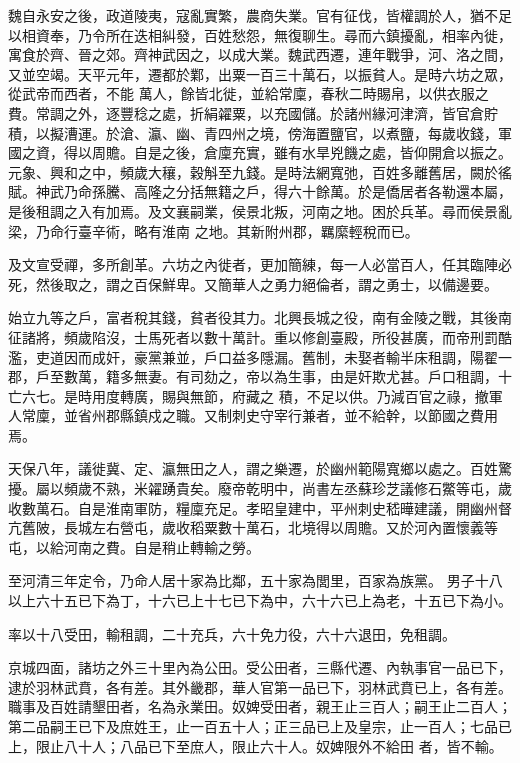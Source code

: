 \begin{pinyinscope}
 魏自永安之後，政道陵夷，寇亂實繁，農商失業。官有征伐，皆權調於人，猶不足以相資奉，乃令所在迭相糾發，百姓愁怨，無復聊生。尋而六鎮擾亂，相率內徙，寓食於齊、晉之郊。齊神武因之，以成大業。魏武西遷，連年戰爭，河、洛之間，又並空竭。天平元年，遷都於鄴，出粟一百三十萬石，以振貧人。是時六坊之眾，從武帝而西者，不能
 萬人，餘皆北徙，並給常廩，春秋二時賜帛，以供衣服之費。常調之外，逐豐稔之處，折絹糴粟，以充國儲。於諸州緣河津濟，皆官倉貯積，以擬漕運。於滄、瀛、幽、青四州之境，傍海置鹽官，以煮鹽，每歲收錢，軍國之資，得以周贍。自是之後，倉廩充實，雖有水旱兇饑之處，皆仰開倉以振之。元象、興和之中，頻歲大穰，穀斛至九錢。是時法網寬弛，百姓多離舊居，闕於徭賦。神武乃命孫騰、高隆之分括無籍之戶，得六十餘萬。於是僑居者各勒還本屬，是後租調之入有加焉。及文襄嗣業，侯景北叛，河南之地。困於兵革。尋而侯景亂梁，乃命行臺辛術，略有淮南
 之地。其新附州郡，羈縻輕稅而已。



 及文宣受禪，多所創革。六坊之內徙者，更加簡練，每一人必當百人，任其臨陣必死，然後取之，謂之百保鮮卑。又簡華人之勇力絕倫者，謂之勇士，以備邊要。



 始立九等之戶，富者稅其錢，貧者役其力。北興長城之役，南有金陵之戰，其後南征諸將，頻歲陷沒，士馬死者以數十萬計。重以修創臺殿，所役甚廣，而帝刑罰酷濫，吏道因而成奸，豪黨兼並，戶口益多隱漏。舊制，未娶者輸半床租調，陽翟一郡，戶至數萬，籍多無妻。有司劾之，帝以為生事，由是奸欺尤甚。戶口租調，十亡六七。是時用度轉廣，賜與無節，府藏之
 積，不足以供。乃減百官之祿，撤軍人常廩，並省州郡縣鎮戍之職。又制刺史守宰行兼者，並不給幹，以節國之費用焉。



 天保八年，議徙冀、定、瀛無田之人，謂之樂遷，於幽州範陽寬鄉以處之。百姓驚擾。屬以頻歲不熟，米糴踴貴矣。廢帝乾明中，尚書左丞蘇珍芝議修石鱉等屯，歲收數萬石。自是淮南軍防，糧廩充足。孝昭皇建中，平州刺史嵇曄建議，開幽州督亢舊陂，長城左右營屯，歲收稻粟數十萬石，北境得以周贍。又於河內置懷義等屯，以給河南之費。自是稍止轉輸之勞。



 至河清三年定令，乃命人居十家為比鄰，五十家為閭里，百家為族黨。
 男子十八以上六十五已下為丁，十六已上十七已下為中，六十六已上為老，十五已下為小。



 率以十八受田，輸租調，二十充兵，六十免力役，六十六退田，免租調。



 京城四面，諸坊之外三十里內為公田。受公田者，三縣代遷、內執事官一品已下，逮於羽林武賁，各有差。其外畿郡，華人官第一品已下，羽林武賁已上，各有差。職事及百姓請墾田者，名為永業田。奴婢受田者，親王止三百人；嗣王止二百人；第二品嗣王已下及庶姓王，止一百五十人；正三品已上及皇宗，止一百人；七品已上，限止八十人；八品已下至庶人，限止六十人。奴婢限外不給田
 者，皆不輸。




\end{pinyinscope}
